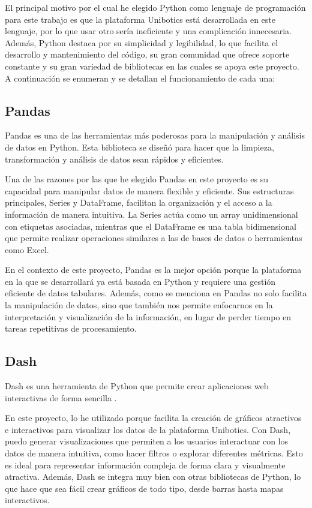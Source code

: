 \documentclass[a4paper, 12pt]{book}
\begin{document}
El principal motivo por el cual he elegido Python como lenguaje de programación para este trabajo es que la plataforma Unibotics está desarrollada en este lenguaje, por lo que usar otro sería ineficiente y una complicación innecesaria. Además, Python destaca por su simplicidad y legibilidad, lo que facilita el desarrollo y mantenimiento del código, su gran comunidad que ofrece soporte constante y su gran variedad de bibliotecas en las cuales se apoya este proyecto. A continuación se enumeran y se detallan el funcionamiento de cada una:

\subsection{Pandas}\label{subsec:Pandas}
Pandas es una de las herramientas más poderosas para la manipulación y análisis de datos en Python. Esta biblioteca se diseñó para hacer que la limpieza, transformación y análisis de datos sean rápidos y eficientes.

Una de las razones por las que he elegido Pandas en este proyecto es su capacidad para manipular datos de manera flexible y eficiente. Sus estructuras principales, Series y DataFrame, facilitan la organización y el acceso a la información de manera intuitiva. La Series actúa como un array unidimensional con etiquetas asociadas, mientras que el DataFrame es una tabla bidimensional que permite realizar operaciones similares a las de bases de datos o herramientas como Excel.

En el contexto de este proyecto, Pandas es la mejor opción porque la plataforma en la que se desarrollará ya está basada en Python y requiere una gestión eficiente de datos tabulares. Además, como se menciona en \cite{mckinney2022python} Pandas no solo facilita la manipulación de datos, sino que también nos permite enfocarnos en la interpretación y visualización de la información, en lugar de perder tiempo en tareas repetitivas de procesamiento.

\subsection{Dash}\label{subsec:dash}
Dash es una herramienta de Python que permite crear aplicaciones web interactivas de forma sencilla \cite{schroeder2022book,dashPlotlyDocumentation}.

En este proyecto, lo he utilizado porque facilita la creación de gráficos atractivos e interactivos para visualizar los datos de la plataforma Unibotics. Con Dash, puedo generar visualizaciones que permiten a los usuarios interactuar con los datos de manera intuitiva, como hacer filtros o explorar diferentes métricas. Esto es ideal para representar información compleja de forma clara y visualmente atractiva. Además, Dash se integra muy bien con otras bibliotecas de Python, lo que hace que sea fácil crear gráficos de todo tipo, desde barras hasta mapas interactivos.
\end{document}
